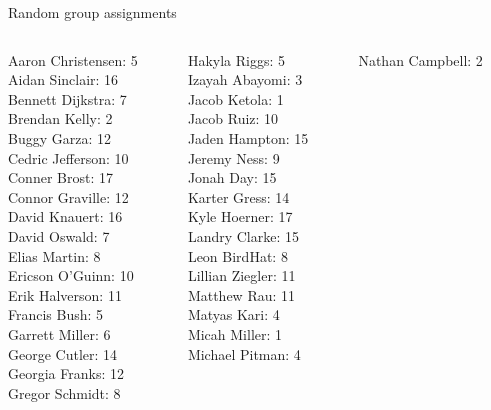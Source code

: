 \documentclass[10pt]{beamer}
\begin{document}
\begin{frame}{Random group assignments}
\footnotesize
\begin{columns}
\begin{column}{0.33\textwidth}
Aaron Christensen: 5 \\ 
Aidan Sinclair: 16 \\ 
Bennett Dijkstra: 7 \\ 
Brendan Kelly: 2 \\ 
Buggy Garza: 12 \\ 
Cedric Jefferson: 10 \\ 
Conner Brost: 17 \\ 
Connor Graville: 12 \\ 
David Knauert: 16 \\ 
David Oswald: 7 \\ 
Elias Martin: 8 \\ 
Ericson O'Guinn: 10 \\ 
Erik Halverson: 11 \\ 
Francis Bush: 5 \\ 
Garrett Miller: 6 \\ 
George Cutler: 14 \\ 
Georgia Franks: 12 \\ 
Gregor Schmidt: 8 \\\end{column}
\begin{column}{0.33\textwidth}
Hakyla Riggs: 5 \\ 
Izayah Abayomi: 3 \\ 
Jacob Ketola: 1 \\ 
Jacob Ruiz: 10 \\ 
Jaden Hampton: 15 \\ 
Jeremy Ness: 9 \\ 
Jonah Day: 15 \\ 
Karter Gress: 14 \\ 
Kyle Hoerner: 17 \\ 
Landry Clarke: 15 \\ 
Leon BirdHat: 8 \\ 
Lillian Ziegler: 11 \\ 
Matthew Rau: 11 \\ 
Matyas Kari: 4 \\ 
Micah Miller: 1 \\ 
Michael Pitman: 4 \\\end{column}
\begin{column}{0.33\textwidth}
Nathan Campbell: 2 \\ 

\end{column}
\end{columns}
\end{frame}
\end{document}
